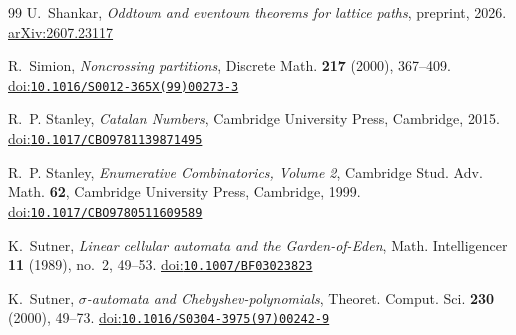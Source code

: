 \documentclass[11pt]{amsart}
\theoremstyle{definition}
\theoremstyle{remark}
\numberwithin{equation}{section}
\providecommand{\doi}[1]{\href{https://doi.org/#1}{doi:\nolinkurl{#1}}}
\begin{document}
\begin{thebibliography}{99}
U.~Shankar, \emph{Oddtown and eventown theorems for lattice paths}, preprint, 2026. \href{https://arxiv.org/abs/2607.23117}{arXiv:2607.23117}

R.~Simion, \emph{Noncrossing partitions}, Discrete Math. \textbf{217} (2000), 367--409. \doi{10.1016/S0012-365X(99)00273-3}

R.~P. Stanley, \emph{Catalan Numbers}, Cambridge University Press, Cambridge, 2015. \doi{10.1017/CBO9781139871495}

R.~P. Stanley, \emph{Enumerative Combinatorics, Volume 2}, Cambridge Stud. Adv. Math. \textbf{62}, Cambridge University Press, Cambridge, 1999. \doi{10.1017/CBO9780511609589}

K.~Sutner, \emph{Linear cellular automata and the Garden-of-Eden}, Math. Intelligencer \textbf{11} (1989), no.~2, 49--53. \doi{10.1007/BF03023823}

K.~Sutner, \emph{$\sigma$-automata and Chebyshev-polynomials}, Theoret. Comput. Sci. \textbf{230} (2000), 49--73. \doi{10.1016/S0304-3975(97)00242-9}

\end{thebibliography}
\end{document}
